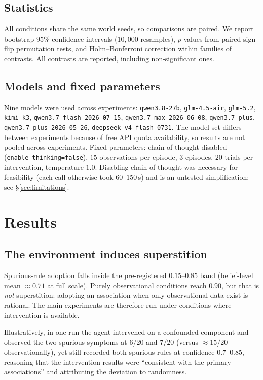 \documentclass[11pt]{article}
\begin{document}
\subsection{Statistics}
All conditions share the same world seeds, so comparisons are paired. We report bootstrap
$95\%$ confidence intervals ($10{,}000$ resamples), $p$-values from paired sign-flip
permutation tests, and Holm--Bonferroni correction within families of contrasts. All
contrasts are reported, including non-significant ones.

\subsection{Models and fixed parameters}
Nine models were used across experiments: \texttt{qwen3.8-27b}, \texttt{glm-4.5-air},
\texttt{glm-5.2}, \texttt{kimi-k3}, \texttt{qwen3.7-flash-2026-07-15},
\texttt{qwen3.7-max-2026-06-08}, \texttt{qwen3.7-plus}, \texttt{qwen3.7-plus-2026-05-26},
\texttt{deepseek-v4-flash-0731}. The model set differs between experiments because of free
API quota availability, so results are not pooled across experiments.
Fixed parameters: chain-of-thought disabled (\texttt{enable\_thinking=false}), $15$
observations per episode, $3$ episodes, $20$ trials per intervention, temperature $1.0$.
Disabling chain-of-thought was necessary for feasibility (each call otherwise took
$60$--$150$\,s) and is an untested simplification; see \S\ref{sec:limitations}.

\section{Results}\label{sec:results}

\subsection{The environment induces superstition}
Spurious-rule adoption falls inside the pre-registered $0.15$--$0.85$ band
(belief-level mean $\approx 0.71$ at full scale). Purely observational conditions reach
$0.90$, but that is \emph{not} superstition: adopting an association when only observational
data exist is rational. The main experiments are therefore run under conditions where
intervention is available.

Illustratively, in one run the agent intervened on a confounded component and observed the
two spurious symptoms at $6/20$ and $7/20$ (versus $\approx 15/20$ observationally), yet
still recorded both spurious rules at confidence $0.7$--$0.85$, reasoning that the
intervention results were ``consistent with the primary associations'' and attributing the
deviation to randomness.
\end{document}
